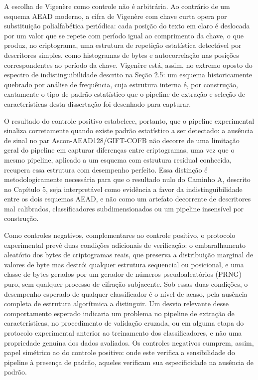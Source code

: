 A escolha de Vigenère como controle não é arbitrária. Ao contrário de um esquema AEAD moderno, a cifra de Vigenère com chave curta opera por substituição polialfabética periódica: cada posição do texto em claro é deslocada por um valor que se repete com período igual ao comprimento da chave, o que produz, no criptograma, uma estrutura de repetição estatística detectável por descritores simples, como histogramas de bytes e autocorrelação nas posições correspondentes ao período da chave. Vigenère está, assim, no extremo oposto do espectro de indistinguibilidade descrito na Seção 2.5: um esquema historicamente quebrado por análise de frequência, cuja estrutura interna é, por construção, exatamente o tipo de padrão estatístico que o pipeline de extração e seleção de características desta dissertação foi desenhado para capturar.

O resultado do controle positivo estabelece, portanto, que o pipeline experimental sinaliza corretamente quando existe padrão estatístico a ser detectado: a ausência de sinal no par Ascon-AEAD128/GIFT-COFB não decorre de uma limitação geral do pipeline em capturar diferenças entre criptogramas, uma vez que o mesmo pipeline, aplicado a um esquema com estrutura residual conhecida, recupera essa estrutura com desempenho perfeito. Essa distinção é metodologicamente necessária para que o resultado nulo do Caminho A, descrito no Capítulo 5, seja interpretável como evidência a favor da indistinguibilidade entre os dois esquemas AEAD, e não como um artefato decorrente de descritores mal calibrados, classificadores subdimensionados ou um pipeline insensível por construção.

Como controles negativos, complementares ao controle positivo, o protocolo experimental prevê duas condições adicionais de verificação: o embaralhamento aleatório dos bytes de criptogramas reais, que preserva a distribuição marginal de valores de byte mas destrói qualquer estrutura sequencial ou posicional, e uma classe de bytes gerados por um gerador de números pseudoaleatórios (PRNG) puro, sem qualquer processo de cifração subjacente. Sob essas duas condições, o desempenho esperado de qualquer classificador é o nível de acaso, pela ausência completa de estrutura algorítmica a distinguir. Um desvio relevante desse comportamento esperado indicaria um problema no pipeline de extração de características, no procedimento de validação cruzada, ou em alguma etapa do protocolo experimental anterior ao treinamento dos classificadores, e não uma propriedade genuína dos dados avaliados. Os controles negativos cumprem, assim, papel simétrico ao do controle positivo: onde este verifica a sensibilidade do pipeline à presença de padrão, aqueles verificam sua especificidade na ausência de padrão.




